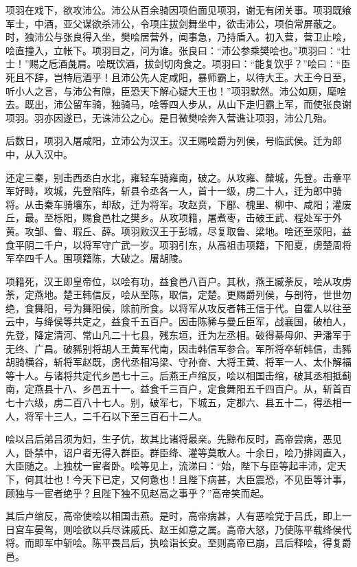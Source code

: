 \documentclass[]{article}
\begin{document}
项羽在戏下，欲攻沛公。沛公从百余骑因项伯面见项羽，谢无有闭关事。项羽既飨军士，中酒，亚父谋欲杀沛公，令项庄拔剑舞坐中，欲击沛公，项伯常屏蔽之。时，独沛公与张良得入坐，樊哙居营外，闻事急，乃持盾入。初入营，营卫止哙，哙直撞入，立帐下。项羽目之，问为谁。张良曰：``沛公参乘樊哙也。''项羽曰：``壮士！''赐之卮酒彘肩。哙既饮酒，拔剑切肉食之。项羽曰：``能复饮乎？''哙曰：``臣死且不辞，岂特卮酒乎！且沛公先人定咸阳，暴师霸上，以待大王。大王今日至，听小人之言，与沛公有隙，臣恐天下解心疑大王也！''项羽默然。沛公如厕，麾哙去。既出，沛公留车骑，独骑马，哙等四人步从，从山下走归霸上军，而使张良谢项羽。羽亦因遂已，无诛沛公之心。是日微樊哙奔入营谯让项羽，沛公几殆。

后数日，项羽入屠咸阳，立沛公为汉王。汉王赐哙爵为列侯，号临武侯。迁为郎中，从入汉中。

还定三秦，别击西丞白水北，雍轻车骑雍南，破之。从攻雍、斄城，先登。击章平军好畤，攻城，先登陷阵，斩县令丞各一人，首十一级，虏二十人，迁为郎中骑将。从击秦车骑壤东，却敌，迁为将军。攻赵贲，下郿、槐里、柳中、咸阳；灌废丘，最。至栎阳，赐食邑杜之樊乡。从攻项籍，屠煮枣，击破王武、程处军于外黄。攻邹、鲁、瑕丘、薛。项羽败汉王于彭城，尽复取鲁、梁地。哙还至荥阳，益食平阴二千户，以将军守广武一岁。项羽引东，从高祖击项籍，下阳夏，虏楚周将军卒四千人。围项籍陈，大破之。屠胡陵。

项籍死，汉王即皇帝位，以哙有功，益食邑八百户。其秋，燕王臧荼反，哙从攻虏荼，定燕地。楚王韩信反，哙从至陈，取信，定楚。更赐爵列侯，与剖符，世世勿绝，食舞阳，号为舞阳侯，除前所食。以将军从攻反者韩王信于代。自霍人以往至云中，与绛侯等共定之，益食千五百户。因击陈豨与曼丘臣军，战襄国，破柏人，先登，降定清河、常山凡二十七县，残东垣，迁为左丞相。破得綦母卯、尹潘军于无终、广昌。破豨别将胡人王黄军代南，因击韩信军参合。军所将卒斩韩信，击豨胡骑横谷，斩将军赵既，虏代丞相冯梁、守孙奋、大将王黄、将军一人、太仆解福等十人。与诸将共定代乡邑七十三。后燕王卢绾反，哙以相国击绾，破其丞相抵蓟南，定燕县十八、乡邑五十一。益食千三百户，定食舞阳五千四百户。从，斩首百七十六级，虏二百八十七人。别，破军七，下城五，定郡六、县五十二，得丞相一人，将军十三人，二千石以下至三百石十二人。

哙以吕后弟吕须为妇，生子伉，故其比诸将最亲。先黥布反时，高帝尝病，恶见人，卧禁中，诏户者无得入群臣。群臣绛、灌等莫敢人。十余日，哙乃排闼直入，大臣随之。上独枕一宦者卧。哙等见上，流涕曰：``始，陛下与臣等起丰沛，定天下，何其壮也！今天下已定，又何惫也！且陛下病甚，大臣震恐，不见臣等计事，顾独与一宦者绝乎？且陛下独不见赵高之事乎？''高帝笑而起。

其后卢绾反，高帝使哙以相国击燕。是时，高帝病甚，人有恶哙党于吕氏，即上一日宫车晏驾，则哙欲以兵尽诛戚氏、赵王如意之属。高帝大怒，乃使陈平载绛侯代将。而即军中斩哙。陈平畏吕后，执哙诣长安。至则高帝已崩，吕后释哙，得复爵邑。
\end{document}
